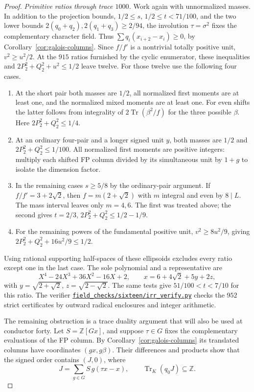 \documentclass[11pt,reqno]{amsart}
\newcommand{\codefile}[1]{\href{https://github.com/sebastienpalcoux/grothendieck-ring-classification/blob/d5750105bb5758f3ad38d2e5464dfcc12c019816/supplements/rank6/sphericality/#1}{\nolinkurl{#1}}}
\theoremstyle{remark}\newtheorem{remark}[theorem]{Remark}
\numberwithin{equation}{section}
\begin{document}
\begin{proof}
\smallskip\noindent\emph{Primitive ratios through trace $1000$.}
Work again with unnormalized masses. In addition to the projection bounds, $1/2\le s$, $1/2\le t<71/100$, and the two lower bounds $2(q_0+q_2),2(q_1+q_3)\ge2/94$, the involution $\tau=\sigma^2$ fixes the complementary character field. Thus $\sum q_i(x_{i+2}-x_i)\ge0$, by Corollary~\ref{cor:galois-columns}. Since $f/f'$ is a nontrivial totally positive unit, $v^2\ge u^2/2$. At the $915$ ratios furnished by the cyclic enumerator, these inequalities and $2P_2^2+Q_2^2+u^2\le1/2$ leave twelve. For those twelve use the following four cases.
\begin{enumerate}
\item At the short pair both masses are $1/2$, all normalized first moments are at least one, and the normalized mixed moments are at least one. For even shifts the latter follows from integrality of $2\operatorname{Tr}(\beta^2/f)$ for the three possible $\beta$. Here $2P_2^2+Q_2^2\le1/4$.
\item At an ordinary four-pair and a longer signed unit $y$, both masses are $1/2$ and $2P_2^2+Q_2^2\le1/100$. All normalized first moments are positive integers: multiply each shifted FP column divided by its simultaneous unit by $1+g$ to isolate the dimension factor.
\item In the remaining cases $s\ge5/8$ by the ordinary-pair argument. If $f/f'=3+2\sqrt2$, then $f=m(2+\sqrt2)$ with $m$ integral and even by $8\mid L$. The mass interval leaves only $m=4,6$. The first was treated above; the second gives $t=2/3$, $2P_2^2+Q_2^2\le1/2-1/9$.
\item For the remaining powers of the fundamental positive unit, $v^2\ge8u^2/9$, giving $2P_2^2+Q_2^2+16u^2/9\le1/2$.
\end{enumerate}
Using rational supporting half-spaces of these ellipsoids excludes every ratio except one in the last case. The sole polynomial and a representative are
\[
 X^4-24X^3+36X^2-16X+2,\qquad x=6+4\sqrt2+5y+2z,
\]
with $y=\sqrt{2+\sqrt2}$, $z=\sqrt{2-\sqrt2}$. The same tests give $51/100<t<7/10$ for this ratio. The verifier \codefile{field_checks/sixteen/irr_verify.py} checks the $952$ strict certificates by outward radical enclosures and integer arithmetic.

The remaining obstruction is a trace duality argument that will also
be used at conductor forty. Let $S=\mathbb Z[Gx]$, and suppose
$\tau\in G$ fixes the complementary evaluations of the FP column.
By Corollary~\ref{cor:galois-columns} its translated columns have
coordinates $(gx,g\beta)$. Their differences and products show that
the signed order contains $(J,0)$, where
\begin{equation}\label{eq:quartic-difference-ideal}
 J=\sum_{g\in G}S\,g(\tau x-x),\qquad
 \operatorname{Tr}_K(q_0J)\subseteq\mathbb Z .
\end{equation}


\end{proof}
\end{document}
